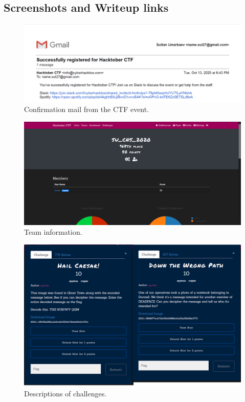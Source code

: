 \documentclass[11 pt]{article}
\begin{document}
\begin{appendices}

\section{Screenshots and Writeup links}
\begin{figure}[H]
    \centering
    \includegraphics[width=1\linewidth]{Registration_confirmation.png}
    \caption{Confirmation mail from the CTF event.}
    \label{fig:emailconfirmation}
\end{figure}

\begin{figure}[H]
    \centering
    \includegraphics[width=1\linewidth]{Team.png}
    \caption{Team information.}
    \label{fig:teaminfo}
\end{figure}

\begin{figure}[H]
    \centering
    \includegraphics[height=0.5\linewidth]{Challenges_info.png}
    \caption{Descriptions of challenges.}
    \label{fig:challenges}
\end{figure}


\end{appendices}
\end{document}
